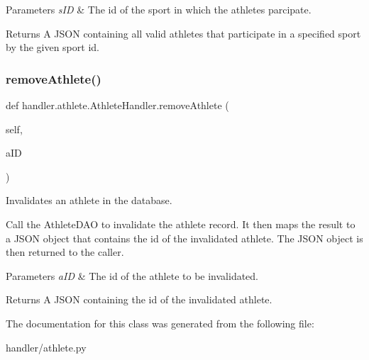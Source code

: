 \begin{DoxyParams}{Parameters}
{\em s\+ID} & The id of the sport in which the athletes parcipate.\\
\hline
\end{DoxyParams}
\begin{DoxyReturn}{Returns}
A J\+S\+ON containing all valid athletes that participate in a specified sport by the given sport id. 
\end{DoxyReturn}
\mbox{\label{classhandler_1_1athlete_1_1_athlete_handler_a9f3ea8fb6c3c156f89c2b2a5bda6e689}} 
\subsubsection{\texorpdfstring{remove\+Athlete()}{removeAthlete()}}
{\footnotesize\ttfamily def handler.\+athlete.\+Athlete\+Handler.\+remove\+Athlete (\begin{DoxyParamCaption}\item[{}]{self,  }\item[{}]{a\+ID }\end{DoxyParamCaption})}



Invalidates an athlete in the database. 

Call the Athlete\+D\+AO to invalidate the athlete record. It then maps the result to a J\+S\+ON object that contains the id of the invalidated athlete. The J\+S\+ON object is then returned to the caller.


\begin{DoxyParams}{Parameters}
{\em a\+ID} & The id of the athlete to be invalidated. \\
\hline
\end{DoxyParams}
\begin{DoxyReturn}{Returns}
A J\+S\+ON containing the id of the invalidated athlete. 
\end{DoxyReturn}


The documentation for this class was generated from the following file\+:\begin{DoxyCompactItemize}
\item 
handler/athlete.\+py\end{DoxyCompactItemize}
